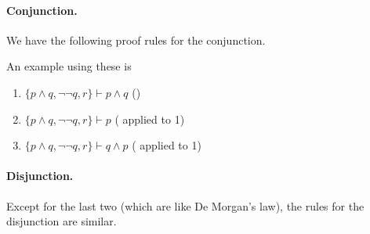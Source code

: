 \paragraph{Conjunction.}

We have the following proof rules for the conjunction.

\begin{prooftree}
\end{prooftree}

\begin{prooftree}
\end{prooftree}

\begin{prooftree}
\end{prooftree}

An example using these is
\begin{enumerate}
	\item $\{p\wedge q, \neg\neg q, r\}\vdash p\wedge q$ \hfill ()
	\item $\{p\wedge q, \neg\neg q, r\}\vdash p$ \hfill ( applied to 1)
	\item $\{p\wedge q, \neg\neg q, r\}\vdash q\wedge p$ \hfill ( applied to 1)
\end{enumerate}

\paragraph{Disjunction.}

Except for the last two (which are like De Morgan's law), the rules for the disjunction are similar.

\begin{prooftree}
\end{prooftree}

\begin{prooftree}
\end{prooftree}


